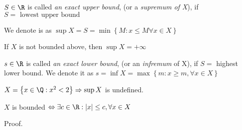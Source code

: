 \begin{definition}
	$S \in \R$ is called \textit{an exact upper bound}, (or a \textit{supremum of X}), if $S = \text{ lowest upper bound } $ 

	We denote is as $\sup X = S = \min \left\{ M: x \leq M \forall x \in X \right \} $ 

	If $X$ is not bounded above, then $\sup X = +\infty$

	$s \in \R$ is called \textit{an exact lower bound}, (or an \textit{infremum} of X), if $S = $ highest lower bound. We denote it as  $s = \inf X = \max \left\{ m: x \geq m, \forall x \in X \right \} $
\end{definition}

\begin{note}[]
	$X = \left\{ x \in \Q: x^2<2 \right \} \Rightarrow \sup X $ is undefined.
\end{note}

\begin{lemma}
	$X$ is bounded  $\Leftrightarrow \exists c \in \R: |x| \leq c, \forall x \in X$
\end{lemma}

\begin{exercise}
	Proof. 
\end{exercise}
